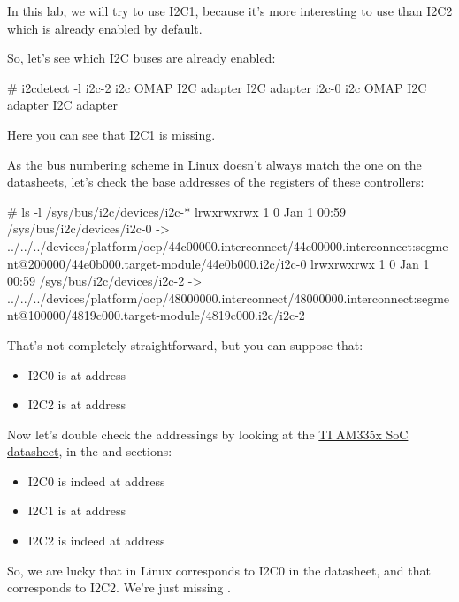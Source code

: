 In this lab, we will try to use I2C1, because it's more interesting to
use than I2C2 which is already enabled by default.

So, let's see which I2C buses are already enabled:

\begin{bashinput}
# i2cdetect -l
i2c-2	i2c             OMAP I2C adapter                        I2C adapter
i2c-0	i2c             OMAP I2C adapter                        I2C adapter
\end{bashinput}

Here you can see that I2C1 is missing.

As the bus numbering scheme in Linux doesn't always match the one
on the datasheets, let's check the base addresses of the registers
of these controllers:

\begin{bashinput}
# ls -l /sys/bus/i2c/devices/i2c-*
lrwxrwxrwx    1         0 Jan  1 00:59 /sys/bus/i2c/devices/i2c-0 -> ../../../devices/platform/ocp/44c00000.interconnect/44c00000.interconnect:segment@200000/44e0b000.target-module/44e0b000.i2c/i2c-0
lrwxrwxrwx    1         0 Jan  1 00:59 /sys/bus/i2c/devices/i2c-2 -> ../../../devices/platform/ocp/48000000.interconnect/48000000.interconnect:segment@100000/4819c000.target-module/4819c000.i2c/i2c-2
\end{bashinput}

That's not completely straightforward, but you can suppose that:
\begin{itemize}
\item I2C0 is at address 
\item I2C2 is at address 
\end{itemize}

Now let's double check the addressings by looking at the
\href{https://www.ti.com/lit/ug/spruh73q/spruh73q.pdf}{TI AM335x SoC
datasheet}, in the  and  sections:

\begin{itemize}
\item I2C0 is indeed at address 
\item I2C1 is at address 
\item I2C2 is indeed at address 
\end{itemize}

So, we are lucky that  in Linux corresponds to I2C0 in the
datasheet, and that  corresponds to I2C2.
We're just missing .

